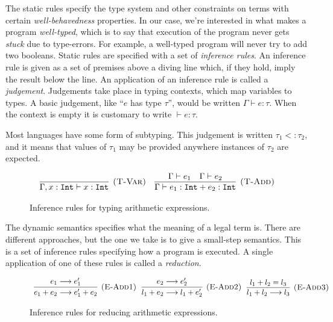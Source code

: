 The static rules specify the type system and other constraints on terms with certain \textit{well-behavedness} properties. In our case, we're interested in what makes a program \textit{well-typed}, which is to say that execution of the program never gets \textit{stuck} due to type-errors. For example, a well-typed program will never try to add two booleans. Static rules are specified with a set of \textit{inference rules}. An inference rule is given as a set of premises above a diving line which, if they hold, imply the result below the line. An application of an inference rule is called a \textit{judgement}. Judgements take place in typing contexts, which map variables to types. A basic judgement, like ``$e$ has type $\tau$'', would be written $\Gamma \vdash e: \tau$. When the context is empty it is customary to write $\vdash e: \tau$.

Most languages have some form of subtyping. This judgement is written $\tau_1 <: \tau_2$, and it means that values of $\tau_1$ may be provided anywhere instances of $\tau_2$ are expected.

\begin{figure}[h]

\noindent
{}

\[
\begin{array}{c}

\infer[\textsc{(T-Var)}]
	{\Gamma, x: \kwa{Int} \vdash x: \kwa{Int}}
	{}
~~~
\infer[\textsc{(T-Add)}]
	{\Gamma \vdash e_1: \kwa{Int} + e_2 : \kwa{Int}}
	{\Gamma \vdash e_1 & \Gamma \vdash e_2}
	
\end{array}
\]

\vspace{-7pt}
\caption{Inference rules for typing arithmetic expressions.}
\label{A sample. }
\end{figure}

The dynamic semantics specifies what the meaning of a legal term is. There are different approaches, but the one we take is to give a small-step semantics. This is a set of inference rules specifying how a program is executed. A single application of one of these rules is called a \textit{reduction}.

\begin{figure}[h]

\noindent
{}

\[
\begin{array}{c}

\infer[\textsc{(E-Add1)}]
	{e_1 + e_2 \longrightarrow e_1' + e_2}
	{e_1 \longrightarrow e_1'}
~~
\infer[\textsc{(E-Add2)}]
	{l_1 + e_2 \longrightarrow l_1 + e_2'}
	{e_2 \longrightarrow e_2'}
~~
\infer[\textsc{(E-Add3)}]
	{l_1 + l_2 \longrightarrow l_3}
	{l_1 + l_2 = l_3}

\end{array}
\]


\vspace{-7pt}
\caption{Inference rules for reducing arithmetic expressions.}
\label{A sample. }
\end{figure}

